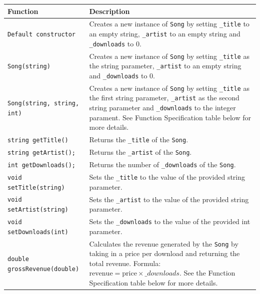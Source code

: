 \renewcommand{\arraystretch}{1.5} 
\begin{longtable}{|p{2.0in}|p{4.0in}|}
\hline
\textbf{Function} & \textbf{Description} \\ \hline

\texttt{Default constructor} & Creates a new instance of \texttt{Song} by setting \texttt{_title} to an empty string,  \texttt{_artist} to an empty string and  \texttt{_downloads} to 0.\\ \hline

\texttt{Song(string)}& Creates a new instance of \texttt{Song} by setting \texttt{_title} as the string parameter,  \texttt{_artist} to an empty string and  \texttt{_downloads} to 0.\\ \hline

\texttt{Song(string, string, int)}& Creates a new instance of \texttt{Song} by setting \texttt{_title} as the first string parameter,  \texttt{_artist} as the second string parameter and  \texttt{_downloads} to the integer parament. See Function Specification table below for more details.\\ \hline

\texttt{string getTitle()}& Returns the \texttt{_title} of the \texttt{Song}.\\ \hline

\texttt{string getArtist();}& Returns the \texttt{_artist} of the \texttt{Song}.\\ \hline 
 \texttt{int getDownloads();}&Returns the 
 number of \texttt{_downloads} of the \texttt{Song}.\\\hline \hline

\texttt{void setTitle(string)}& Sets the \texttt{_title} to the value of the provided string parameter.\\ \hline

\texttt{void setArtist(string)}& Sets the \texttt{_artist} to the value of the provided string parameter.\\ \hline

\texttt{void setDownloads(int)}& Sets the \texttt{_downloads} to the value of the provided int parameter.\\ \hline

\texttt{double grossRevenue(double)} & 
Calculates the revenue generated by the \texttt{Song} by taking in a price per download and returning the total revenue. 
Formula: \(\text{revenue} = \text{price} \times \_downloads\). See the Function Specification table below for more details. \\ \hline


\end{longtable}


